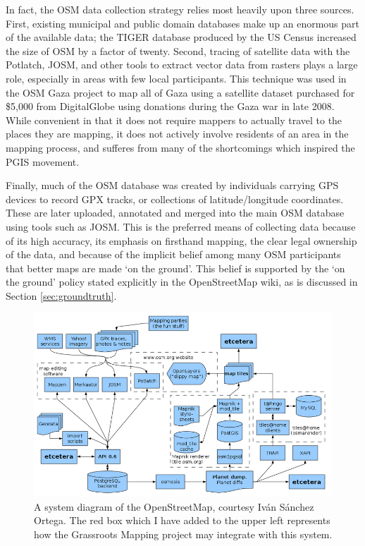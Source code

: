 \documentclass[11pt,oneside,notitlepage]{report}
\begin{document}
{{In fact, the OSM data collection strategy relies most heavily upon three sources. First, existing municipal and public domain databases make up an enormous part of the available data; the TIGER database produced by the US Census increased the size of OSM by a factor of twenty. \cite{willis2007osm} Second, tracing of satellite data with the Potlatch, \ac{JOSM}, and other tools to extract vector data from rasters plays a large role, especially in areas with few local participants. This technique was used in the OSM Gaza project to map all of Gaza using a satellite dataset purchased for \$5,000 from DigitalGlobe using donations during the Gaza war in late 2008. \cite{maron2010openstreetmap}\cite{chilton-crowdsourcing} While convenient in that it does not require mappers to actually travel to the places they are mapping, it does not actively involve residents of an area in the mapping process, and sufferes from many of the shortcomings which inspired the \ac{PGIS} movement. 

Finally, much of the OSM database was created by individuals carrying GPS devices to record GPX tracks, or collections of latitude/longitude coordinates. These are later uploaded, annotated and merged into the main OSM database using tools such as \ac{JOSM}. This is the preferred means of collecting data because of its high accuracy, its emphasis on firsthand mapping, the clear legal ownership of the data, and because of the implicit belief among many OSM participants that better maps are made `on the ground'. This belief is supported by the `on the ground' policy stated explicitly in the OpenStreetMap wiki, as is discussed in Section \ref{sec:groundtruth}.

\begin{figure}[h]
  \begin{center}
    \includegraphics[scale=0.45]{images/osm-diagram.png}
    \caption{A system diagram of the OpenStreetMap, courtesy Iv\'{a}n S\'{a}nchez Ortega. The red box which I have added to the upper left represents how the Grassroots Mapping project may integrate with this system.}
  \end{center}
\end{figure}

}}
\end{document}
